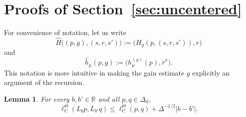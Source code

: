 \documentclass{article}
\newtheorem{lemma}[theorem]{Lemma}
\newcommand{\R}{\mathbb{R}}
\begin{document}
\newpage
\section{Proofs of Section~\ref{sec:uncentered}}\label{app:C}
For convenience of notation, let us write
\begin{equation}
\widehat H\bigl((p, g), (s, r, s') \bigr) := \bigl(H_g(p, (s, r, s')), r \bigr)
\end{equation}
and
\begin{equation}
\hat h_\mu(p, g) := \bigl(h^{(g)}_\mu(p), \bar r^\pi \bigr).
\end{equation}
This notation is more intuitive in making the gain estimate $g$ explicitly an argument of the recursion.
\begin{lemma}\label{lem:appC-1}
For every $b, b' \in \R$ and all $p, q \in \Delta_d$,
\begin{equation}
\ell^\Theta_\mathrm C(L_b p, L_{b'}q) \le \ell^\Theta_\mathrm C(p, q) + \Delta^{-1/2}\lvert b - b'\rvert.
\end{equation}
\end{lemma}
\end{document}
